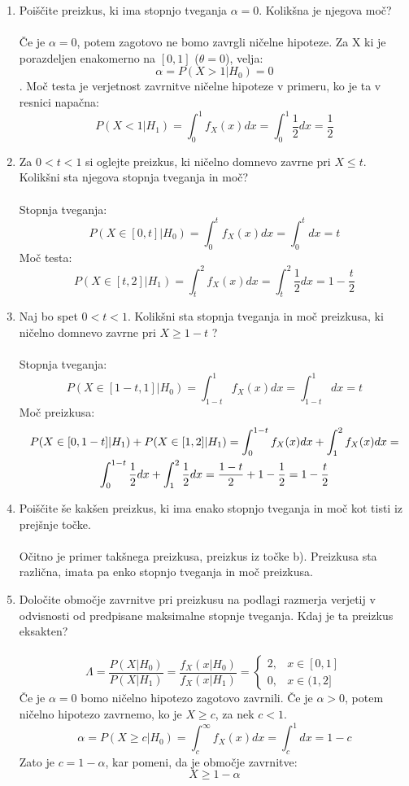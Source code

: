 \documentclass[a4paper]{article}
\begin{document}
\begin{enumerate}[label=(\alph*)]
\item Poiščite preizkus, ki ima stopnjo tveganja $\alpha = 0$. Kolikšna je njegova moč? \\ \\

Če je $\alpha = 0$, potem zagotovo ne bomo zavrgli ničelne hipoteze. Za X ki je porazdeljen enakomerno na $[0,1]$ ($\theta=0$), velja:
$$ \alpha = P(X > 1 | H_{0}) = 0$$.
Moč testa je verjetnost zavrnitve ničelne hipoteze v primeru, ko je ta v resnici napačna:
$$P(X < 1 | H_{1}) = \int_{0}^{1} f_X(x) dx = \int_{0}^{1} \frac{1}{2}dx = \frac{1}{2} $$

\item Za $0 < t < 1$ si oglejte preizkus, ki ničelno domnevo zavrne pri $X \leqslant t$. Kolikšni
sta njegova stopnja tveganja in moč? \\ \\
Stopnja tveganja:
$$P(X \in [0,t] | H_{0}) = \int_{0}^{t} f_X(x) dx = \int_{0}^{t} dx = t $$
Moč testa:
$$P(X\in [t, 2] | H_{1}) = \int_{t}^{2} f_X(x)dx = \int_{t}^{2} \frac{1}{2} dx =1- \frac{t}{2} $$

\item Naj bo spet $0 < t < 1$. Kolikšni sta stopnja tveganja in moč preizkusa, ki
ničelno domnevo zavrne pri $X \geqslant 1-t$ ? \\ \\
Stopnja tveganja: 
$$P(X \in [1-t,1] | H_{0}) = \int_{1-t}^{1} f_X(x) dx = \int_{1-t}^{1} dx = t $$
Moč preizkusa:
\begin{multline*} P(X\in [0,1-t] | H_{1}) + P(X\in [1,2] | H_{1})= \int_{0}^{1-t} f_X(x)dx +  \int_{1}^{2} f_X(x)dx =  \\\int_{0}^{1-t} \frac{1}{2} dx +  \int_{1}^{2} \frac{1}{2} dx= \frac{1-t}{2} + 1 - \frac{1}{2} = 1- \frac{t}{2} $$
\end{multline*}
\item Poiščite še kakšen preizkus, ki ima enako stopnjo tveganja in moč kot tisti iz
prejšnje točke. \\ \\
Očitno je primer takšnega preizkusa, preizkus iz točke b). Preizkusa sta različna, imata pa enko stopnjo tveganja in moč preizkusa.

\item Določite območje zavrnitve pri preizkusu na podlagi razmerja verjetij v odvisnosti od predpisane maksimalne stopnje tveganja. Kdaj je ta preizkus eksakten? \\ \\
$$\Lambda = \frac{P(X|H_{0})}{P(X|H_{1})} = \frac{f_X(x|H_0)}{f_X(x|H_{1})} = \left\{
  \begin{array}{lr}
    2, & x \in [0,1]\\
    0, & x \in (1,2]
  \end{array}
\right.  $$
Če je $\alpha = 0$ bomo ničelno hipotezo zagotovo zavrnili. Če je $\alpha > 0$, potem ničelno hipotezo zavrnemo, ko je $X \geqslant c$, za nek $c<1$.
$$\alpha = P(X \geqslant c | H_{0}) = \int_{c}^{\infty} f_X(x) dx = \int_{c}^{1} dx =1-c $$
Zato je $c = 1-\alpha$, kar pomeni, da je območje zavrnitve:
$$X \geqslant 1-\alpha$$


\end{enumerate}
\end{document}
